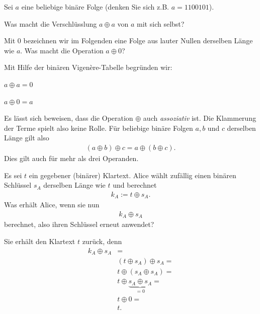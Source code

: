 \begin{myexercise}
	Sei $a$ eine beliebige binäre Folge (denken Sie sich z.B. $a = 1100101$).
	\begin{aenum}
		\item Was macht die Verschlüsslung $a\oplus a$ von $a$ mit sich selbst?
		\item Mit $0$ bezeichnen wir im Folgenden eine Folge aus lauter Nullen derselben Länge wie $a$. Was macht die Operation $a\oplus 0$?
	\end{aenum}
	\begin{myanswer}
		Mit Hilfe der binären Vigenère-Tabelle begründen wir:
		\begin{aenum}
			\item $a\oplus a = 0$
			\item $a\oplus 0 = a$
		\end{aenum}
	\end{myanswer}
\end{myexercise}
Es lässt sich beweisen, dass die Operation $\oplus$ auch \textit{assoziativ} ist. Die Klammerung der Terme spielt also keine Rolle. Für beliebige binäre Folgen $a,b$ und $c$ derselben Länge gilt also
\begin{align*}
	(a\oplus b) \oplus c = a\oplus (b\oplus c).
\end{align*}
Dies gilt auch für mehr als drei Operanden.

\begin{myexercise}
	Es sei $t$ ein gegebener (binärer) Klartext. Alice wählt zufällig einen binären Schlüssel $s_A$ derselben Länge wie $t$ und berechnet
	\begin{align*}
		k_A := t\oplus s_A.
	\end{align*}
	Was erhält Alice, wenn sie nun
	\begin{align*}
		k_A\oplus s_A
	\end{align*}
	berechnet, also ihren Schlüssel erneut anwendet?
	\begin{myanswer}
		Sie erhält den Klartext $t$ zurück, denn
		\begin{align*}
			k_A\oplus s_A & =                                          \\
			              & (t\oplus s_A)\oplus s_A =                  \\
			              & t\oplus (s_A\oplus s_A) =                  \\
			              & t\oplus \underbrace{s_A\oplus s_A}_{= 0} = \\
			              & t\oplus 0 =                                \\
			              & t.
		\end{align*}
	\end{myanswer}
\end{myexercise}


